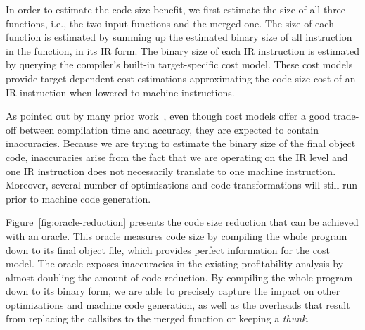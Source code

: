 In order to estimate the code-size benefit, we first estimate the size of all three functions, i.e., the two input functions and the merged one.
The size of each function is estimated by summing up the estimated binary size of all instruction in the function, in its IR form.
The binary size of each IR instruction is estimated by querying the compiler's built-in target-specific cost model.
These cost models provide target-dependent cost estimations approximating the code-size cost of an IR instruction when lowered to machine instructions.

As pointed out by many prior work~\cite{porpodas18a,porpodas18b,porpodas19,mendis19}, even though cost models offer a good trade-off between compilation time and accuracy, they are expected to contain inaccuracies.
Because we are trying to estimate the binary size of the final object code, inaccuracies arise from the fact that we are operating on the IR level and one IR instruction does not necessarily translate to one machine instruction.
Moreover, several number of optimisations and code transformations will still run prior to machine code generation.

Figure~\ref{fig:oracle-reduction} presents the code size reduction that can be achieved with an oracle.
This oracle measures code size by compiling the whole program down to its final object file, which provides perfect information for the cost model.
The oracle exposes inaccuracies in the existing profitability analysis by almost doubling the amount of code reduction.
By compiling the whole program down to its binary form, we are able to precisely capture the impact on other optimizations and machine code generation, as well as the overheads that result from replacing the callsites to the merged function or keeping a \textit{thunk}.

